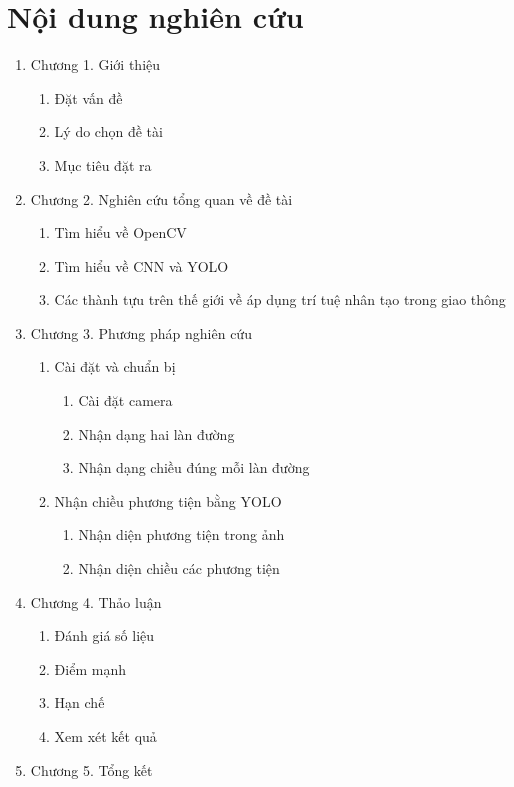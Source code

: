 \documentclass[12pt,twoside,a4paper]{article}
\begin{document}
\section{Nội dung nghiên cứu}
\renewcommand{\labelenumi}{\arabic{enumi}.}
\renewcommand{\labelenumii}{\labelenumi\arabic{enumii}.}
\renewcommand{\labelenumiii}{\labelenumii\arabic{enumiii}.}
\large
\begin{enumerate}
	\item Chương 1. Giới thiệu
	\begin{enumerate}
		\item Đặt vấn đề
		\item Lý do chọn đề tài 
		\item Mục tiêu đặt ra
	\end{enumerate}
	\item Chương 2. Nghiên cứu tổng quan về đề tài
	\begin{enumerate}
		\item Tìm hiểu về OpenCV
		\item Tìm hiểu về CNN và YOLO
		\item Các thành tựu trên thế giới về áp dụng trí tuệ nhân tạo trong giao thông
	\end{enumerate}
	\item Chương 3. Phương pháp nghiên cứu
	\begin{enumerate}
		\item Cài đặt và chuẩn bị
		\begin{enumerate}
			\item Cài đặt camera
			\item Nhận dạng hai làn đường
			\item Nhận dạng chiều đúng mỗi làn đường
		\end{enumerate}
		\item Nhận chiều phương tiện bằng YOLO
		\begin{enumerate}
			\item Nhận diện phương tiện trong ảnh
			\item Nhận diện chiều các phương tiện
		\end{enumerate}
	\end{enumerate}
	\item Chương 4. Thảo luận
	\begin{enumerate}
		\item Đánh giá số liệu
		\item Điểm mạnh
		\item Hạn chế
		\item Xem xét kết quả
	\end{enumerate}
	\item Chương 5. Tổng kết
\end{enumerate}
\end{document}
